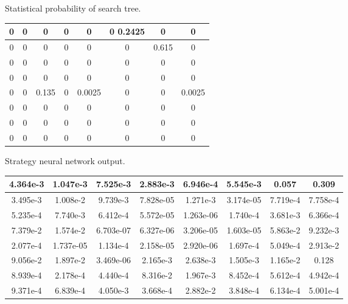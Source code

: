 \begin{table}[htbp]
	\centering
	{Statistical probability of search tree.}
	\label{tab:moxinggailv3}
\begin{tabular}{|c|c|c|c|c|c|c|c|}
	\hline 
	0& 0 & 0 &0  & 0 &0 0.2425 & 0 &0  \\ 
	\hline 
	0 & 0 & 0 & 0 & 0 & 0 & 0.615 & 0 \\ 
	\hline 
	0 & 0 & 0 & 0 & 0 & 0 & 0 & 0 \\ 
	\hline 
	0 & 0 & 0 & 0 & 0& 0 & 0 & 0 \\ 
	\hline 
	0 & 0 & 0.135 & 0 & 0.0025 & 0 & 0 & 0.0025 \\ 
	\hline 
	0 & 0 & 0 & 0 & 0 & 0 & 0 & 0 \\ 
	\hline 
	0 & 0 & 0 & 0 & 0 & 0 & 0 & 0 \\ 
	\hline 
	0 & 0 & 0 & 0 & 0 & 0 & 0 & 0 \\ 
	\hline 
\end{tabular}
\end{table}


\begin{table}[htbp]
	\centering
	{Strategy neural network output.}
	\label{tab:celueshenjingwangluoshuchu}
	\begin{tabular}{|c|c|c|c|c|c|c|c|}
		\hline 
		4.364e-3 & 1.047e-3 & 7.525e-3 & 2.883e-3 & 6.946e-4 & 5.545e-3 & 0.057 & 0.309 \\ 
		\hline 
		3.495e-3 & 1.008e-2 & 9.739e-3 & 7.828e-05 & 1.271e-3 & 3.174e-05 & 7.719e-4 & 7.758e-4 \\ 
		\hline 
		5.235e-4 & 7.740e-3 & 6.412e-4 & 5.572e-05 & 1.263e-06 & 1.740e-4 & 3.681e-3 & 6.366e-4 \\ 
		\hline 
		7.379e-2 & 1.574e-2 & 6.703e-07 & 6.327e-06 & 3.206e-05 & 1.603e-05 & 5.863e-2 & 9.232e-3 \\ 
		\hline 
		2.077e-4 & 1.737e-05 & 1.134e-4 & 2.158e-05 & 2.920e-06 & 1.697e-4 & 5.049e-4 & 2.913e-2 \\ 
		\hline 
		9.056e-2 & 1.897e-2 & 3.469e-06 & 2.165e-3 & 2.638e-3 & 1.505e-3 & 1.165e-2 & 0.128 \\ 
		\hline 
		8.939e-4 & 2.178e-4 & 4.440e-4 & 8.316e-2 & 1.967e-3 & 8.452e-4 & 5.612e-4 & 4.942e-4 \\ 
		\hline 
		9.371e-4 & 6.839e-4 & 4.050e-3 & 3.668e-4 & 2.882e-2 & 3.848e-4 & 6.134e-4 &5.001e-4 \\ 
		\hline 
	\end{tabular} 
\end{table}

